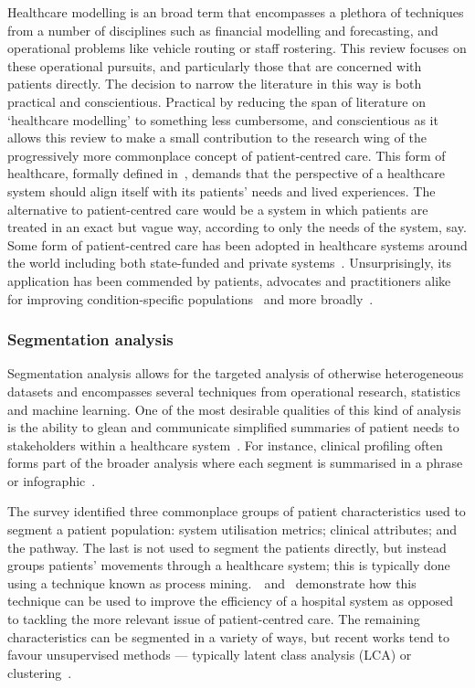 Healthcare modelling is an broad term that encompasses a plethora of techniques
from a number of disciplines such as financial modelling and forecasting, and
operational problems like vehicle routing or staff rostering. This review
focuses on these operational pursuits, and particularly those that are concerned
with patients directly. The decision to narrow the literature in this way is
both practical and conscientious. Practical by reducing the span of literature
on `healthcare modelling' to something less cumbersome, and conscientious as it
allows this review to make a small contribution to the research wing of the
progressively more commonplace concept of patient-centred care. This form of
healthcare, formally defined in~\cite{Robinson2008}, demands that the
perspective of a healthcare system should align itself with its patients' needs
and lived experiences. The alternative to patient-centred care would be a system
in which patients are treated in an exact but vague way, according to only the
needs of the system, say. Some form of patient-centred care has been adopted in
healthcare systems around the world including both state-funded and private
systems~\cite{DoH2010,Dewi2013,Luxford2011}. Unsurprisingly, its application has
been commended by patients, advocates and practitioners alike for improving
condition-specific
populations~\cite{Foster2019,Gambling2010,Gondek2016,Tsianakas2012} and more
broadly~\cite{IAPO2012,Richards2015,Santana2019}.

\subsubsection{Segmentation analysis}

Segmentation analysis allows for the targeted analysis of otherwise
heterogeneous datasets and encompasses several techniques from operational
research, statistics and machine learning. One of the most desirable qualities
of this kind of analysis is the ability to glean and communicate simplified
summaries of patient needs to stakeholders within a healthcare
system~\cite{Vuik2016b, Yoon2020}. For instance, clinical profiling often forms
part of the broader analysis where each segment is summarised in a phrase or
infographic~\cite{Vuik2016a,Yan2019}.

The survey identified three commonplace groups of patient characteristics used
to segment a patient population: system utilisation metrics; clinical
attributes; and the pathway. The last is not used to segment the patients
directly, but instead groups patients' movements through a healthcare system;
this is typically done using a technique known as process
mining.~\cite{Arnolds2018}~and~\cite{Delias2015} demonstrate how this technique
can be used to improve the efficiency of a hospital system as opposed to
tackling the more relevant issue of patient-centred care. The remaining
characteristics can be segmented in a variety of ways, but recent works tend to
favour unsupervised methods --- typically latent class analysis (LCA) or
clustering~\cite{Yan2018}.

